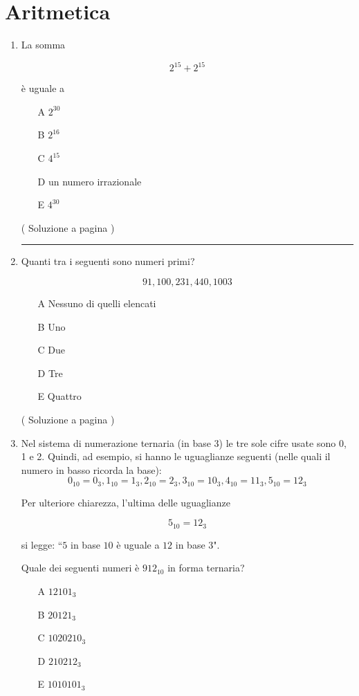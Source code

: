\section{Aritmetica}\label{sec:aritmetica}

\begin{enumerate}
\item \label{ari_01}

La somma

\[
2^{15} + 2^{15}
\]

è uguale a

\begin{itemize}
\item[A] $2^{30}$
\item[B] $2^{16}$
\item[C] $4^{15}$
\item[D] un numero irrazionale
\item[E] $4^{30}$
\end{itemize}

( Soluzione a pagina \pageref{aris_01} )


\vspace{1cm}
\hrule
\vspace{1cm}

\item \label{ari_02}
Quanti tra i seguenti sono numeri primi?

\[
91,  100,  231,  440,  1003
\]


\begin{itemize}
\item[A] Nessuno di quelli elencati
\item[B] Uno
\item[C] Due
\item[D] Tre
\item[E] Quattro
\end{itemize}


( Soluzione a pagina \pageref{aris_02} )

\item 
Nel sistema di numerazione ternaria (in base $3$) le tre sole cifre usate sono 0, 1 e 2.
Quindi, ad esempio, si hanno le uguaglianze seguenti (nelle quali il numero in basso ricorda la base):
\[
0_{10} = 0_3 , 1_{10} = 1_3 , 2_{10} = 2_3 ,  3_{10} = 10_3 ,  4_{10} = 11_3 , 5_{10} = 12_3
\]

Per ulteriore chiarezza, l'ultima delle uguaglianze

\[
5_{10} = 12_3
\]

si legge: ``$5$ in base $10$ è uguale a $12$ in base $3$".

Quale dei seguenti numeri è $912_{10}$ in forma ternaria?

\begin{itemize}
\item[A] 
$12101_3$
\item[B]
$20121_3$
\item[C]
$1020210_3$
\item[D]
$210212_3$
\item[E]
$1010101_3$
\end{itemize}



\end{enumerate}

